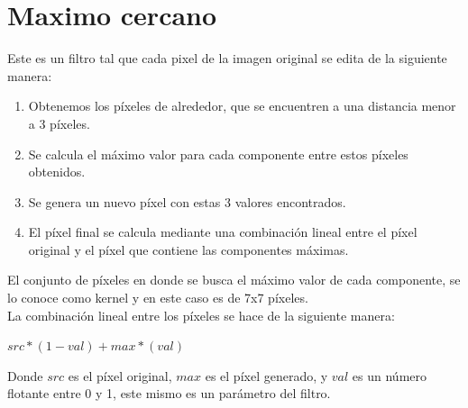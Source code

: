 \section{Maximo cercano}


Este es un filtro tal que cada pixel de la imagen original se edita de la siguiente manera:

\begin{enumerate}
	\item Obtenemos los píxeles de alrededor, que se encuentren a una distancia menor a 3 píxeles.
	\item Se calcula el máximo valor para cada componente entre estos píxeles obtenidos.
	\item Se genera un nuevo píxel con estas 3 valores encontrados.
	\item El píxel final se calcula mediante una combinación lineal entre el píxel original y el píxel que contiene las componentes máximas.
\end{enumerate}

El conjunto de píxeles en donde se busca el máximo valor de cada componente, se lo conoce como kernel y en este caso es de 7x7 píxeles.\\
La combinación lineal entre los píxeles se hace de la siguiente manera:
\begin{center}
$src * (1 - val) + max * (val)$
\end{center}
Donde $src$ es el píxel original, $max$ es el píxel generado, y $val$ es un número flotante entre 0 y 1, este mismo es un parámetro del filtro.

